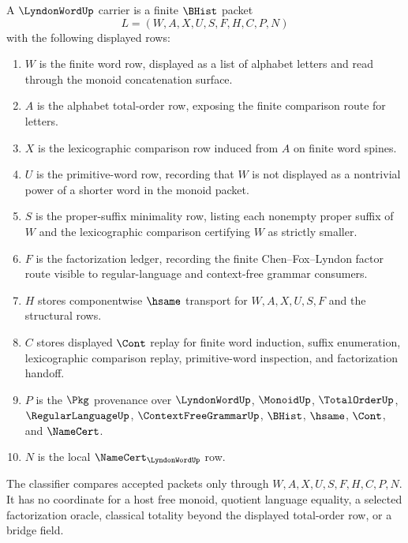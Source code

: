 \begin{definition}
\label{def:lyndon-word-carrier}
A $\LyndonWordUp$ carrier is a finite $\BHist$ packet
$$
L=(W,A,X,U,S,F,H,C,P,N)
$$
with the following displayed rows:
\begin{enumerate}
\item $W$ is the finite word row, displayed as a list of alphabet letters and read through the monoid concatenation surface.
\item $A$ is the alphabet total-order row, exposing the finite comparison route for letters.
\item $X$ is the lexicographic comparison row induced from $A$ on finite word spines.
\item $U$ is the primitive-word row, recording that $W$ is not displayed as a nontrivial power of a shorter word in the monoid packet.
\item $S$ is the proper-suffix minimality row, listing each nonempty proper suffix of $W$ and the lexicographic comparison certifying $W$ as strictly smaller.
\item $F$ is the factorization ledger, recording the finite Chen--Fox--Lyndon factor route visible to regular-language and context-free grammar consumers.
\item $H$ stores componentwise $\hsame$ transport for $W,A,X,U,S,F$ and the structural rows.
\item $C$ stores displayed $\Cont$ replay for finite word induction, suffix enumeration, lexicographic comparison replay, primitive-word inspection, and factorization handoff.
\item $P$ is the $\Pkg$ provenance over $\LyndonWordUp$, $\MonoidUp$, $\TotalOrderUp$, $\RegularLanguageUp$, $\ContextFreeGrammarUp$, $\BHist$, $\hsame$, $\Cont$, and $\NameCert$.
\item $N$ is the local $\NameCert_{\LyndonWordUp}$ row.
\end{enumerate}
The classifier compares accepted packets only through $W,A,X,U,S,F,H,C,P,N$. It has no coordinate for a host free monoid, quotient language equality, a selected factorization oracle, classical totality beyond the displayed total-order row, or a bridge field.
\end{definition}

